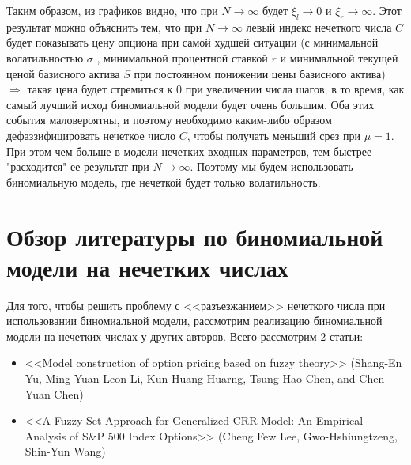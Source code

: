 \documentclass[a4paper,12pt]{extarticle} %
\begin{document}
	Таким образом, из графиков видно, что при $N \to \infty$ будет $\xi_l \to 0$ и $\xi_r \to \infty$. Этот результат можно объяснить тем, что при $N \to \infty$ левый индекс нечеткого числа $C$ будет показывать цену опциона при самой худшей ситуации (с минимальной волатильностью $\sigma$ , минимальной процентной ставкой $r$ и минимальной текущей ценой базисного актива $S$ при постоянном понижении цены базисного актива) $\Rightarrow$ такая цена будет стремиться к $0$ при увеличении числа шагов; в то время, как самый лучший исход биномиальной модели будет очень большим. Оба этих события маловероятны, и поэтому необходимо каким-либо образом дефаззифицировать нечеткое число $C$, чтобы получать меньший срез при $\mu=1$. При этом чем больше в модели нечетких входных параметров, тем быстрее "расходится" ее результат при $N \to \infty$. Поэтому мы будем использовать биномиальную модель, где нечеткой будет только волатильность. 	
	
	\section{Обзор литературы по биномиальной модели на нечетких числах}
	Для того, чтобы решить проблему с <<разъезжанием>> нечеткого числа при использовании биномиальной модели, рассмотрим реализацию биномиальной модели на нечетких числах у других авторов. Всего рассмотрим $2$ статьи:
	\begin{itemize}
		\item <<Model construction of option pricing based on fuzzy theory>> \cite{2} (Shang-En Yu, Ming-Yuan Leon Li, Kun-Huang Huarng, Tsung-Hao Chen, and Chen-Yuan Chen)
		\item <<A Fuzzy Set Approach for Generalized CRR Model: An Empirical Analysis of S\&P 500 Index Options>> \cite{3} (Cheng Few Lee, Gwo-Hshiungtzeng, Shin-Yun Wang)
	\end{itemize}
\end{document}

